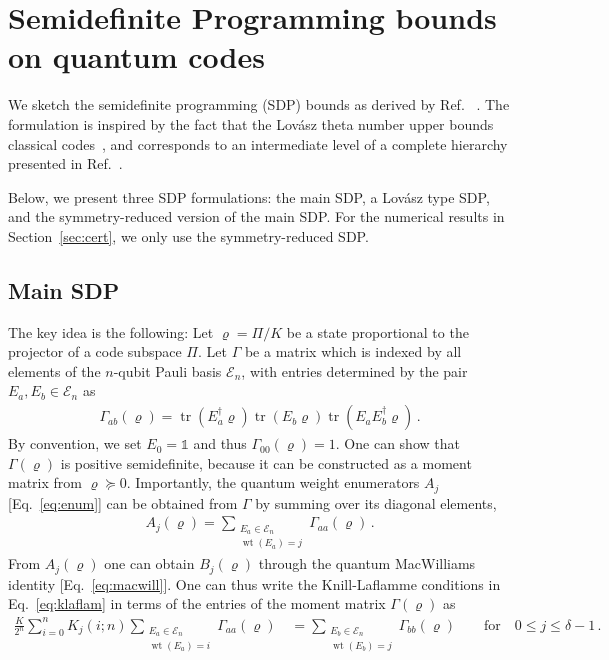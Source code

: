 \documentclass[12pt,a4paper]{amsart}
\DeclareMathOperator{\tr}{tr}
\DeclareMathOperator{\wt}{wt}
\newcommand{\one}[0]{\mathds{1}}
\newcommand{\E}{\mathcal{E}}
\begin{document}
\section{Semidefinite Programming bounds on quantum codes}

We sketch the semidefinite programming (SDP) bounds as derived by Ref.
~\cite[Theorem 22]{munne2025sdpboundsquantumcodes}. 
% 
The formulation is inspired by the fact that the Lovász theta number upper bounds classical codes~\cite{1055985}, 
and corresponds to an intermediate level of a complete hierarchy presented in Ref.~\cite[Theorem 7]{munne2025sdpboundsquantumcodes}.

Below, we present three SDP formulations:
the main SDP, a Lov\'asz type SDP, and the symmetry-reduced version of
the main SDP. For the numerical results in Section~\ref{sec:cert}, 
we only use the symmetry-reduced SDP.


\subsection{Main SDP}The key idea is the following: Let $\varrho=\Pi/K$ be a state proportional to the projector of a code subspace $\Pi$. 
Let $\Gamma$ be a matrix which is indexed by all elements of the $n$-qubit Pauli basis 
$\E_n$, with entries determined by the pair $E_a, E_b \in \E_n$ as
% 
\begin{align}\label{eq:moment}
    \Gamma_{ab}(\varrho)=\tr(E^\dagger_a \varrho) \tr(E_b \varrho) \tr(E_aE^\dagger_b\varrho) \,.
\end{align}
% 
By convention, we set $E_0=\one$ and thus $\Gamma_{00}(\varrho)=1$.
% 
One can show that $\Gamma(\varrho)$ is positive semidefinite, 
because it can be constructed as a moment matrix from $\varrho\succeq0$. 
% 
Importantly, the quantum weight enumerators $A_j$~ [Eq.~\eqref{eq:enum}] can be obtained from $\Gamma$ by summing over its diagonal elements,
%
\begin{align}\label{eq:AfromGamma}
 A_j(\varrho) =\sum_{\substack{E_a\in \E_n \\ \wt(E_a) = j}} \Gamma_{aa}(\varrho) \,.
\end{align}
From $A_j(\varrho)$ one can obtain $B_j(\varrho)$ through the
quantum MacWilliams identity [Eq.~\eqref{eq:macwill}].
% 
One can thus write the Knill-Laflamme conditions in Eq.~\eqref{eq:klaflam} in terms of the entries of the moment matrix $\Gamma(\varrho)$ as
% 
\begin{align}\label{eq:klred}
	\frac{K}{2^n}\sum^n_{i=0} K_j(i;n) \!\!\sum_{\substack{E_{a} \in \E_n \\ \wt(E_a)=i}} \Gamma_{aa}(\varrho) \quad
	= \sum_{\substack{E_b \in \E_n \\ \wt(E_b)=j}} \Gamma_{bb}(\varrho) \quad\quad \text{for} \quad 0 \leq j\leq \delta-1  \,.
\end{align}
 
\end{document}
